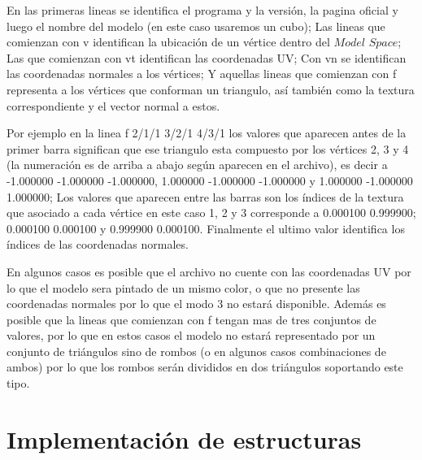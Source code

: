 \documentclass[a4paper]{article}
\newcounter{col}
\begin{document}
En las primeras lineas se identifica el programa y la versión, la pagina oficial y luego el nombre del modelo (en este caso usaremos un cubo); Las lineas que comienzan con v identifican la ubicación de un vértice dentro del $Model$ $Space$; Las que comienzan con vt identifican las coordenadas UV; Con vn se identifican las coordenadas normales a los vértices; Y aquellas lineas que comienzan con f representa a los vértices que conforman un triangulo, así también como la textura correspondiente y el vector normal a estos.
\par Por ejemplo en la linea f 2/1/1 3/2/1 4/3/1 los valores que aparecen antes de la primer barra significan que ese triangulo esta compuesto por los vértices 2, 3 y 4 (la numeración es de arriba a abajo según aparecen en el archivo), es decir a -1.000000 -1.000000 -1.000000, 1.000000 -1.000000 -1.000000 y 1.000000 -1.000000 1.000000; Los valores que aparecen entre las barras son los índices de la textura que asociado a cada vértice en este caso 1, 2 y 3 corresponde a 0.000100 0.999900; 0.000100 0.000100 y 0.999900 0.000100. Finalmente el ultimo valor identifica los índices de las coordenadas normales.
\par En algunos casos es posible que el archivo no cuente con las coordenadas UV por lo que el modelo sera pintado de un mismo color, o que no presente las coordenadas normales por lo que el modo 3 no estará disponible. Además es posible que la lineas que comienzan con f tengan mas de tres conjuntos de valores, por lo que en estos casos el modelo no estará representado por un conjunto de triángulos sino de rombos (o en algunos casos combinaciones de ambos) por lo que los rombos serán divididos en dos triángulos soportando este tipo. 

\section{Implementación de estructuras}
\end{document}
